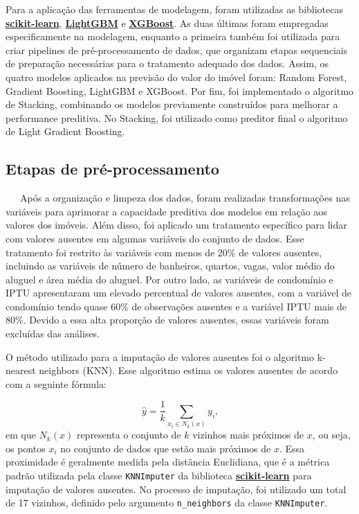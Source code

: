 \documentclass[
  12pt,
  a4paper,
]{scrreprt}
\begin{document}
\vspace{12pt}

Para a aplicação das ferramentas de modelagem, foram utilizadas as
bibliotecas
\href{https://scikit-learn.org/stable/}{\textbf{scikit-learn}},
\href{https://lightgbm.readthedocs.io/en/stable/}{\textbf{LightGBM}} e
\href{https://xgboost.readthedocs.io/en/stable/}{\textbf{XGBoost}}. As
duas últimas foram empregadas especificamente na modelagem, enquanto a
primeira também foi utilizada para criar pipelines de pré-processamento
de dados, que organizam etapas sequenciais de preparação necessárias
para o tratamento adequado dos dados. Assim, os quatro modelos aplicados
na previsão do valor do imóvel foram: Random Forest, Gradient Boosting,
LightGBM e XGBoost. Por fim, foi implementado o algoritmo de Stacking,
combinando os modelos previamente construídos para melhorar a
performance preditiva. No Stacking, foi utilizado como preditor final o
algoritmo de Light Gradient Boosting.

\subsection{Etapas de
pré-processamento}\label{etapas-de-pruxe9-processamento}

~~~Após a organização e limpeza dos dados, foram realizadas
transformações nas variáveis para aprimorar a capacidade preditiva dos
modelos em relação aos valores dos imóveis. Além disso, foi aplicado um
tratamento específico para lidar com valores ausentes em algumas
variáveis do conjunto de dados. Esse tratamento foi restrito às
variáveis com menos de 20\% de valores ausentes, incluindo as variáveis
de número de banheiros, quartos, vagas, valor médio do aluguel e área
média do aluguel. Por outro lado, as variáveis de condomínio e IPTU
apresentaram um elevado percentual de valores ausentes, com a variável
de condomínio tendo quase 60\% de observações ausentes e a variável IPTU
mais de 80\%. Devido a essa alta proporção de valores ausentes, essas
variáveis foram excluídas das análises.

\vspace{12pt}

O método utilizado para a imputação de valores ausentes foi o algoritmo
k-nearest neighbors (KNN). Esse algoritmo estima os valores ausentes de
acordo com a seguinte fórmula:

\[
\hat{y} = \frac{1}{k}\sum_{x_i \in N_k\left(x\right)}y_i\text{,}
\] em que \(N_k(x)\) representa o conjunto de \(k\) vizinhos mais
próximos de \(x\), ou seja, os pontos \(x_i\) no conjunto de dados que
estão mais próximos de \(x\). Essa proximidade é geralmente medida pela
distância Euclidiana, que é a métrica padrão utilizada pela classe
\texttt{KNNImputer} da biblioteca
\href{https://scikit-learn.org/stable/}{\textbf{scikit-learn}} para
imputação de valores ausentes. No processo de imputação, foi utilizado
um total de 17 vizinhos, definido pelo argumento \texttt{n\_neighbors}
da classe \texttt{KNNImputer}.
\end{document}
